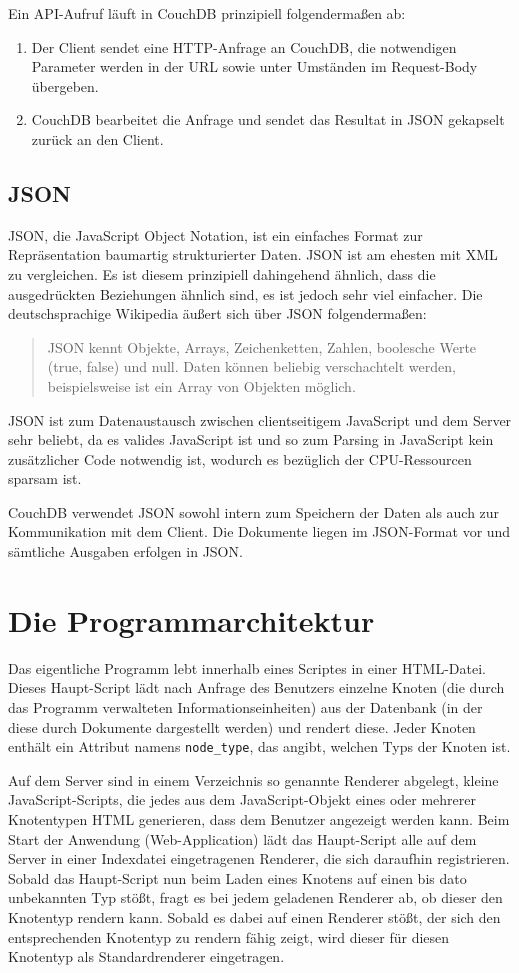 \documentclass[12pt,ngerman,a4]{scrartcl}
\newcommand{\pquote}[1]{\glqq #1\grqq}
\newcommand{\code}[1]{\texttt{#1}}
\begin{document}
Ein API-Aufruf läuft in CouchDB prinzipiell folgendermaßen ab:
\begin{enumerate}
\item Der Client sendet eine HTTP-Anfrage an CouchDB, die notwendigen Parameter werden in der URL sowie unter Umständen im Request-Body übergeben.
\item CouchDB bearbeitet die Anfrage und sendet das Resultat in JSON gekapselt zurück an den Client.
\end{enumerate}
\subsection{JSON}
JSON, die JavaScript Object Notation, ist ein einfaches Format zur Repräsentation baumartig strukturierter Daten. JSON ist am ehesten mit XML zu vergleichen. Es ist diesem prinzipiell dahingehend ähnlich, dass die ausgedrückten Beziehungen ähnlich sind, es ist jedoch sehr viel einfacher. Die deutschsprachige Wikipedia äußert sich über JSON folgendermaßen:
\begin{quote}
JSON kennt Objekte, Arrays, Zeichenketten, Zahlen, boolesche Werte (true, false) und null. Daten können beliebig verschachtelt werden, beispielsweise ist ein Array von Objekten möglich.\cite{wpjson}
\end{quote}
JSON ist zum Datenaustausch zwischen clientseitigem JavaScript und dem Server sehr beliebt, da es valides JavaScript ist und so zum Parsing in JavaScript kein zusätzlicher Code notwendig ist, wodurch es bezüglich der CPU-Ressourcen sparsam ist.

CouchDB verwendet JSON sowohl intern zum Speichern der Daten als auch zur Kommunikation mit dem Client. Die Dokumente liegen im JSON-Format vor und sämtliche Ausgaben erfolgen in JSON.

\section{Die Programmarchitektur}
Das eigentliche Programm lebt innerhalb eines Scriptes in einer HTML-Datei. 
Dieses \pquote{Haupt-Script} lädt nach Anfrage des Benutzers einzelne Knoten (die durch das Programm verwalteten Informationseinheiten) aus der Datenbank (in der diese durch Dokumente dargestellt werden) und rendert diese. Jeder Knoten enthält ein Attribut namens \code{node\_type}, das angibt, welchen Typs der Knoten ist.

Auf dem Server sind in einem Verzeichnis so genannte Renderer abgelegt, kleine JavaScript-Scripts, die jedes aus dem JavaScript-Objekt eines oder mehrerer Knotentypen HTML generieren, dass dem Benutzer angezeigt werden kann. Beim Start der Anwendung (Web-Application) lädt das Haupt-Script alle auf dem Server in einer Indexdatei eingetragenen Renderer, die sich daraufhin registrieren. Sobald das Haupt-Script nun beim Laden eines Knotens auf einen bis dato unbekannten Typ stößt, fragt es bei jedem geladenen Renderer ab, ob dieser den Knotentyp rendern kann. Sobald es dabei auf einen Renderer stößt, der sich den entsprechenden Knotentyp zu rendern fähig zeigt, wird dieser für diesen Knotentyp als Standardrenderer eingetragen.
\end{document}
